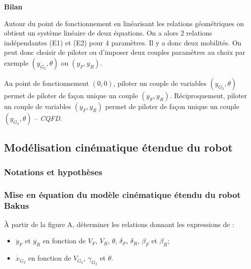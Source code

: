 \documentclass[11pt]{article}
\begin{document}
\begin{UPSTIcorrige}
\textbf{Bilan}

Autour du point de fonctionnement en linéarisant les relations géométriques on obtient un système linéaire de deux équations. On a alors 2 relations indépendantes (E1) et (E2) pour 4 paramètres. Il y a donc deux mobilités. On peut donc choisir de piloter ou d'imposer deux couples paramètres au choix par exemple  $\left (y_{G_2},\theta \right)$ ou $\left(y_F,y_R\right)$.

Au point de fonctionnement $\left(0,0\right)$, piloter un couple de variables $\left (y_{G_2},\theta \right)$ permet de piloter de façon unique un couple $\left(y_F,y_R\right)$. Réciproquement, piloter un couple de variables $\left(y_F,y_R\right)$ permet de piloter de façon unique un couple $\left (y_{G_2},\theta \right)$ --  \textit{CQFD}.

\end{UPSTIcorrige}


\subsection{Modélisation cinématique étendue du robot}



\subsubsection{Notations et hypothèses}

\subsubsection{Mise en équation du modèle cinématique étendu du robot Bakus}

\UPSTIquestion* À partir de la figure A, déterminer les relations donnant les expressions de :
\begin{itemize}
\item $\dot{y}_F$ et $\dot{y_R}$ en fonction de $V_F$, $V_R$, $\theta$, $\delta_F$, $\delta_R$, $\beta_F$ et $\beta_R$;
\item $\dot{x}_{G_2}$ en fonction de $V_{G_2}$, $\gamma_{G_2}$ et $\theta$.
\end{itemize}
\end{document}
